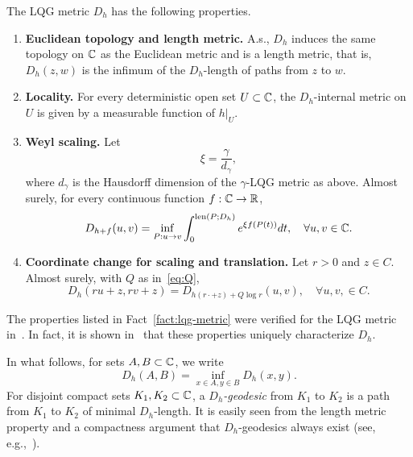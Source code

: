 \documentclass[12pt]{amsart}
\numberwithin{equation}{section}
\begin{document}
	\begin{fact} \label{fact:lqg-metric}
		The LQG metric $D_h$ has the following properties.
		\begin{enumerate}[label=\Roman*.]
			\item {\bf Euclidean topology and length metric.} A.s., $D_h$ induces the same topology on $\mathbb{C}$ as the Euclidean metric and is a length metric, that is, $D_h(z,w)$ is the infimum of the $D_h$-length of paths from $z$ to $w$.
			\item {\bf Locality.} For every deterministic open set $U \subset \mathbb{C}$, the $D_h$-internal metric on $U$ is given by a measurable function of 
			$h \vert_{U}$. 
			\item {\bf Weyl scaling.} Let 
			\begin{equation} \label{eq:xi}
			\xi = \frac{\gamma}{d_{\gamma}} ,
			\end{equation}
			where $d_\gamma$ is the Hausdorff dimension of the $\gamma$-LQG metric as above. 
			Almost surely, for every continuous function $f: \mathbb{C} \to \mathbb{R}$,
			\[
			D_{h + f}(u, v) = \inf_{P: u \to v} \int_0^{\mathrm{len}(P; D_h)} e^{\xi f(P(t))} d t, \quad \forall u,v \in \mathbb{C}.
			\]
			
			\item {\bf Coordinate change for scaling and translation.} Let $r > 0$ and $z \in C$. Almost surely, with $Q$ as in~\eqref{eq:Q},  
			\[
			D_h(r u + z, r v + z) = D_{h(r\cdot +z) + Q \log r}(u,v), \quad \forall u,v, \in C.
			\]
		\end{enumerate}
	\end{fact}
	
	The properties listed in Fact~\ref{fact:lqg-metric} were verified for the LQG metric in~\cite{ding2020tightness,dubedat2020weak,gwynne2021existence}. In fact, it is shown in~\cite{gwynne2021existence} that these properties uniquely characterize $D_h$. 
	
	
	In what follows, for sets $A,B\subset \mathbb{C}$, we write
	\begin{equation} \label{eq:set-dist}
	D_h(A,B) = \inf_{x\in A, y\in B} D_h(x,y) .
	\end{equation} 
	For disjoint compact sets $K_1,K_2\subset \mathbb{C}$, a \emph{$D_h$-geodesic} from $K_1$ to $K_2$ is a path from $K_1$ to $K_2$ of minimal $D_h$-length. It is easily seen from the length metric property and a compactness argument that $D_h$-geodesics always exist (see, e.g.,~\cite[Corollary 2.5.20]{bbi-metric-geometry}). 
	
	
	
\end{document}
